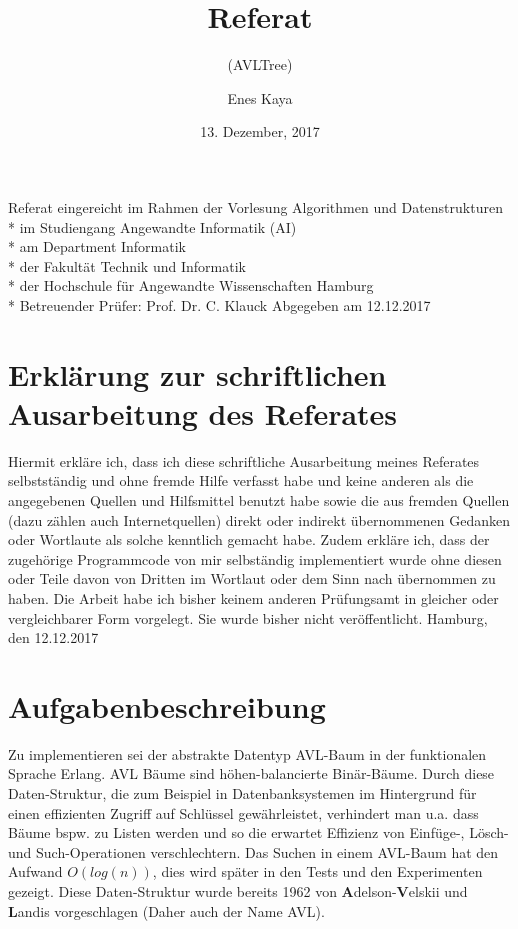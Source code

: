 \documentclass{article}
\title{Referat}
\subtitle{(AVLTree)}
\date{13. Dezember, 2017}
\author{Enes Kaya}
\begin{document}
  \maketitle
  \newpage

  Referat eingereicht im Rahmen der Vorlesung Algorithmen und Datenstrukturen\\*
  im Studiengang Angewandte Informatik (AI)\\*
  am Department Informatik\\*
  der Fakultät Technik und Informatik\\*
  der Hochschule für Angewandte Wissenschaften Hamburg\\*
  \newline
  Betreuender Prüfer: Prof. Dr. C. Klauck
  \newline
  Abgegeben am 12.12.2017
  
  \newpage
  \tableofcontents
  
  \newpage
  \section{Erklärung zur schriftlichen Ausarbeitung des Referates}
  
  Hiermit erkläre ich, dass ich diese schriftliche Ausarbeitung meines Referates selbstständig und ohne fremde Hilfe verfasst habe und keine anderen als die angegebenen Quellen und Hilfsmittel benutzt habe sowie die aus fremden Quellen (dazu zählen auch Internetquellen) direkt oder indirekt übernommenen Gedanken oder Wortlaute als solche kenntlich gemacht habe. Zudem erkläre ich, dass der zugehörige Programmcode von mir selbständig implementiert wurde ohne diesen oder Teile davon von Dritten im Wortlaut oder dem Sinn nach übernommen zu haben. Die Arbeit habe ich bisher keinem anderen Prüfungsamt in gleicher oder vergleichbarer Form vorgelegt. Sie wurde bisher nicht veröffentlicht.
  \newline
  \newline
  \newline
  Hamburg, den 12.12.2017
  
  \newpage
  \section{Aufgabenbeschreibung}
	Zu implementieren sei der abstrakte Datentyp AVL-Baum in der funktionalen Sprache Erlang. AVL Bäume sind höhen-balancierte Binär-Bäume. Durch diese Daten-Struktur, die zum Beispiel in Datenbanksystemen im Hintergrund für einen effizienten Zugriff auf Schlüssel gewährleistet, verhindert man u.a. dass Bäume bspw. zu Listen werden und so die erwartet Effizienz von Einfüge-, Lösch- und Such-Operationen verschlechtern. Das Suchen in einem AVL-Baum hat den Aufwand $O(log(n))$, dies wird später in den Tests und den Experimenten gezeigt.
	Diese Daten-Struktur wurde bereits 1962 von \textbf{A}delson-\textbf{V}elskii und \textbf{L}andis vorgeschlagen (Daher auch der Name AVL).
	
\end{document}
